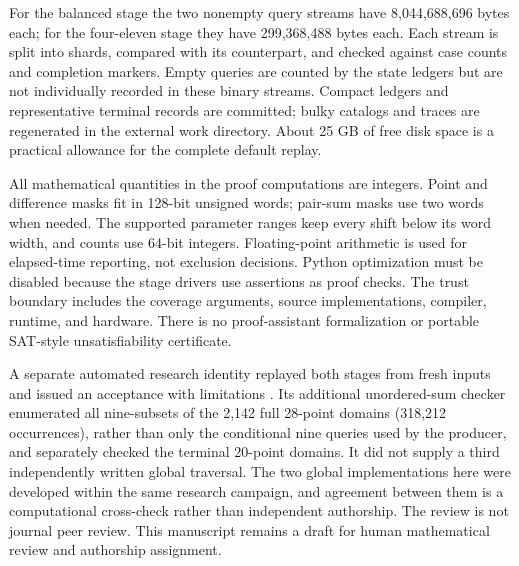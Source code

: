 \documentclass[11pt]{article}
\begin{document}
For the balanced stage the two nonempty query streams have
8,044,688,696 bytes each; for the four-eleven stage they have 299,368,488
bytes each. Each stream is split into shards, compared with its counterpart,
and checked against case counts and completion markers. Empty queries
are counted by the state ledgers but are not individually recorded in
these binary streams. Compact ledgers and representative terminal
records are committed; bulky catalogs and traces are regenerated in the
external work directory. About 25 GB of free disk space is a practical
allowance for the complete default replay.

All mathematical quantities in the proof computations are integers.
Point and difference masks fit in 128-bit unsigned words; pair-sum masks
use two words when needed. The supported parameter ranges keep every
shift below its word width, and counts use 64-bit integers. Floating-point
arithmetic is used for elapsed-time reporting, not exclusion decisions.
Python optimization must be disabled because the stage drivers use
assertions as proof checks. The trust boundary includes the coverage
arguments, source implementations, compiler, runtime, and hardware.
There is no proof-assistant formalization or portable SAT-style
unsatisfiability certificate.

A separate automated research identity replayed both stages from fresh
inputs and issued an acceptance with limitations \cite{review}. Its
additional unordered-sum checker enumerated all nine-subsets of the
2,142 full 28-point domains (318,212 occurrences), rather than only the
conditional nine queries used by the producer, and separately checked
the terminal 20-point domains. It did not supply a third independently
written global traversal. The two global implementations here were
developed within the same research campaign, and agreement between them
is a computational cross-check rather than independent authorship.
The review is not journal peer review. This manuscript remains a draft
for human mathematical review and authorship assignment.

\appendix
\end{document}
